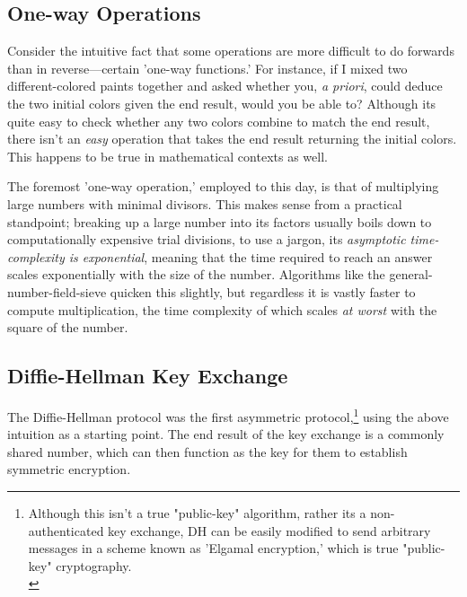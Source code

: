 \documentclass[11pt, a4paper]{report}
\begin{document}

\subsection{One-way Operations}

Consider the intuitive fact that some operations are more difficult to do forwards than in reverse—certain 'one-way functions.' For instance, if I mixed two different-colored paints together and asked whether you, \textit{a priori}, could deduce the two initial colors given the end result, would you be able to? Although its quite easy to check whether any two colors combine to match the end result, there isn't an \textit{easy} operation that takes the end result returning the initial colors. This happens to be true in mathematical contexts as well. 

The foremost 'one-way operation,' employed to this day, is that of multiplying large numbers with minimal divisors. This makes sense from a practical standpoint; breaking up a large number into its factors usually boils down to computationally expensive trial divisions, to use a jargon, its \textit{asymptotic time-complexity is exponential}, meaning that the time required to reach an answer scales exponentially with the size of the number. Algorithms like the general-number-field-sieve quicken this slightly,\autocite[1482]{pomerance} but regardless it is vastly faster to compute multiplication, the time complexity of which scales \textit{at worst} with the square of the number.\autocite{bunimov}

\subsection{Diffie-Hellman Key Exchange}

The Diffie-Hellman protocol was the first asymmetric protocol,\footnote{Although this isn't a true "public-key" algorithm, rather its a non-authenticated key exchange, DH can be easily modified to send arbitrary messages in a scheme known as 'Elgamal encryption,' which is true "public-key" cryptography.\\\autocite{elgamal}} using the above intuition as a starting point. The end result of the key exchange is a commonly shared number, which can then function as the key for them to establish symmetric encryption.
\end{document}
